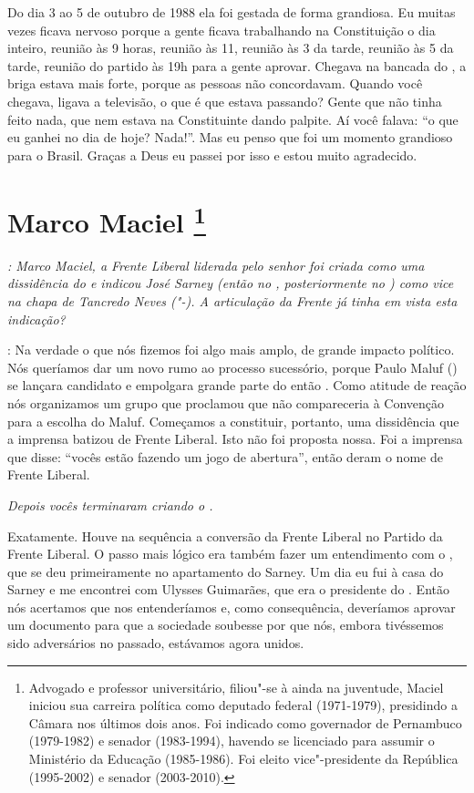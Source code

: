 Do dia 3 ao 5 de outubro de 1988 ela foi gestada de forma grandiosa. Eu
muitas vezes ficava nervoso porque a gente ficava trabalhando na
Constituição o dia inteiro, reunião às 9 horas, reunião às 11, reunião
às 3 da tarde, reunião às 5 da tarde, reunião do partido às 19h para a
gente aprovar. Chegava na bancada do , a briga estava mais forte,
porque as pessoas não concordavam. Quando você chegava, ligava a
televisão, o que é que estava passando? Gente que não tinha feito nada,
que nem estava na Constituinte dando palpite. Aí você falava: ``o que eu
ganhei no dia de hoje? Nada!''. Mas eu penso que foi um momento
grandioso para o Brasil. Graças a Deus eu passei por isso e estou muito
agradecido.

\chapter{Marco Maciel
\footnote{Advogado e professor universitário, filiou"-se à  ainda na
juventude, Maciel iniciou sua carreira política como deputado federal
(1971-1979), presidindo a Câmara nos últimos dois anos. Foi indicado
como governador de Pernambuco (1979-1982) e senador (1983-1994), havendo
se licenciado para assumir o Ministério da Educação (1985-1986). Foi
eleito vice"-presidente da República (1995-2002) e senador (2003-2010).}}

\emph{: Marco Maciel, a Frente Liberal liderada pelo senhor foi criada
como uma dissidência do  e indicou José Sarney (então no ,
posteriormente no ) como vice na chapa de Tancredo Neves
("-). A articulação da Frente já tinha em vista
esta indicação?}

: Na verdade o que nós fizemos foi algo mais amplo,
de grande impacto político. Nós queríamos dar um novo rumo ao processo
sucessório, porque Paulo Maluf () se lançara candidato e empolgara
grande parte do então . Como atitude de reação nós organizamos um
grupo que proclamou que não compareceria à Convenção para a escolha do
Maluf. Começamos a constituir, portanto, uma dissidência que a imprensa
batizou de Frente Liberal. Isto não foi proposta nossa. Foi a imprensa
que disse: ``vocês estão fazendo um jogo de abertura'', então deram o
nome de Frente Liberal.

\medskip

\noindent\emph{Depois vocês terminaram criando o .}

Exatamente. Houve na sequência a conversão da Frente
Liberal no Partido da Frente Liberal. O passo mais lógico era também
fazer um entendimento com o , que se deu primeiramente no
apartamento do Sarney. Um dia eu fui à casa do Sarney e me encontrei com
Ulysses Guimarães, que era o presidente do . Então nós acertamos que
nos entenderíamos e, como consequência, deveríamos aprovar um documento
para que a sociedade soubesse por que nós, embora tivéssemos sido
adversários no passado, estávamos agora unidos.

